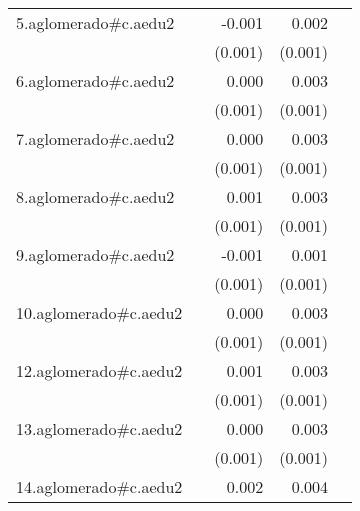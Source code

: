 {\begin{longtable}{l*{4}{D{.}{.}{-1}}}
\addlinespace
5.aglomerado#c.aedu2&                     &      -0.001         &       0.002\sym{**} &                     \\
            &                     &     (0.001)         &     (0.001)         &                     \\
\addlinespace
6.aglomerado#c.aedu2&                     &       0.000         &       0.003\sym{***}&                     \\
            &                     &     (0.001)         &     (0.001)         &                     \\
\addlinespace
7.aglomerado#c.aedu2&                     &       0.000         &       0.003\sym{***}&                     \\
            &                     &     (0.001)         &     (0.001)         &                     \\
\addlinespace
8.aglomerado#c.aedu2&                     &       0.001         &       0.003\sym{***}&                     \\
            &                     &     (0.001)         &     (0.001)         &                     \\
\addlinespace
9.aglomerado#c.aedu2&                     &      -0.001         &       0.001         &                     \\
            &                     &     (0.001)         &     (0.001)         &                     \\
\addlinespace
10.aglomerado#c.aedu2&                     &       0.000         &       0.003\sym{***}&                     \\
            &                     &     (0.001)         &     (0.001)         &                     \\
\addlinespace
12.aglomerado#c.aedu2&                     &       0.001         &       0.003\sym{***}&                     \\
            &                     &     (0.001)         &     (0.001)         &                     \\
\addlinespace
13.aglomerado#c.aedu2&                     &       0.000         &       0.003\sym{***}&                     \\
            &                     &     (0.001)         &     (0.001)         &                     \\
\addlinespace
14.aglomerado#c.aedu2&                     &       0.002         &       0.004\sym{***}&                     \\

\end{longtable}}
